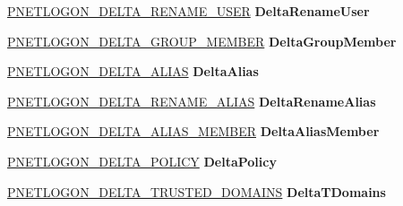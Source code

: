 \begin{DoxyCompactItemize}
\hyperlink{struct___n_e_t_l_o_g_o_n___d_e_l_t_a___r_e_n_a_m_e___u_s_e_r}{P\+N\+E\+T\+L\+O\+G\+O\+N\+\_\+\+D\+E\+L\+T\+A\+\_\+\+R\+E\+N\+A\+M\+E\+\_\+\+U\+S\+ER} {\bfseries Delta\+Rename\+User}
\item 
\mbox{\label{union___n_e_t_l_o_g_o_n___d_e_l_t_a___u_n_i_o_n_aedb284e6e7e075385b57ec733f637de8}} 
\hyperlink{struct___n_e_t_l_o_g_o_n___d_e_l_t_a___g_r_o_u_p___m_e_m_b_e_r}{P\+N\+E\+T\+L\+O\+G\+O\+N\+\_\+\+D\+E\+L\+T\+A\+\_\+\+G\+R\+O\+U\+P\+\_\+\+M\+E\+M\+B\+ER} {\bfseries Delta\+Group\+Member}
\item 
\mbox{\label{union___n_e_t_l_o_g_o_n___d_e_l_t_a___u_n_i_o_n_ad2217f8079db82b8a324c09227920bf0}} 
\hyperlink{struct___n_e_t_l_o_g_o_n___d_e_l_t_a___a_l_i_a_s}{P\+N\+E\+T\+L\+O\+G\+O\+N\+\_\+\+D\+E\+L\+T\+A\+\_\+\+A\+L\+I\+AS} {\bfseries Delta\+Alias}
\item 
\mbox{\label{union___n_e_t_l_o_g_o_n___d_e_l_t_a___u_n_i_o_n_a1fa80ba6db4cdc64620cd3a46a5bc208}} 
\hyperlink{struct___n_e_t_l_o_g_o_n___d_e_l_t_a___r_e_n_a_m_e___a_l_i_a_s}{P\+N\+E\+T\+L\+O\+G\+O\+N\+\_\+\+D\+E\+L\+T\+A\+\_\+\+R\+E\+N\+A\+M\+E\+\_\+\+A\+L\+I\+AS} {\bfseries Delta\+Rename\+Alias}
\item 
\mbox{\label{union___n_e_t_l_o_g_o_n___d_e_l_t_a___u_n_i_o_n_a845c118619e89539bd19befdd14707e4}} 
\hyperlink{struct___n_e_t_l_o_g_o_n___d_e_l_t_a___a_l_i_a_s___m_e_m_b_e_r}{P\+N\+E\+T\+L\+O\+G\+O\+N\+\_\+\+D\+E\+L\+T\+A\+\_\+\+A\+L\+I\+A\+S\+\_\+\+M\+E\+M\+B\+ER} {\bfseries Delta\+Alias\+Member}
\item 
\mbox{\label{union___n_e_t_l_o_g_o_n___d_e_l_t_a___u_n_i_o_n_a575b463fbad87867dc204a03c98c62e3}} 
\hyperlink{struct___n_e_t_l_o_g_o_n___d_e_l_t_a___p_o_l_i_c_y}{P\+N\+E\+T\+L\+O\+G\+O\+N\+\_\+\+D\+E\+L\+T\+A\+\_\+\+P\+O\+L\+I\+CY} {\bfseries Delta\+Policy}
\item 
\mbox{\label{union___n_e_t_l_o_g_o_n___d_e_l_t_a___u_n_i_o_n_a6afd6fabafe21664b14ae185e5830499}} 
\hyperlink{struct___n_e_t_l_o_g_o_n___d_e_l_t_a___t_r_u_s_t_e_d___d_o_m_a_i_n_s}{P\+N\+E\+T\+L\+O\+G\+O\+N\+\_\+\+D\+E\+L\+T\+A\+\_\+\+T\+R\+U\+S\+T\+E\+D\+\_\+\+D\+O\+M\+A\+I\+NS} {\bfseries Delta\+T\+Domains}

\end{DoxyCompactItemize}
